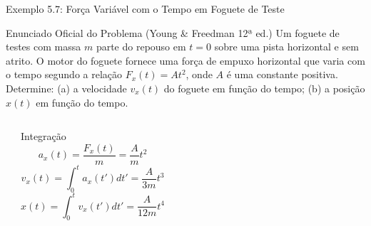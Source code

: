 \documentclass[10pt,aspectratio=169]{beamer}
\begin{document}
\begin{frame}{Exemplo 5.7: Força Variável com o Tempo em Foguete de Teste}
    \begin{block}{Enunciado Oficial do Problema (Young \& Freedman 12ª ed.)}
        \small
        Um foguete de testes com massa $m$ parte do repouso em $t=0$ sobre uma pista horizontal e sem atrito. O motor do foguete fornece uma força de empuxo horizontal que varia com o tempo segundo a relação $F_x(t) = A t^2$, onde $A$ é uma constante positiva. Determine: (a) a velocidade $v_x(t)$ do foguete em função do tempo; (b) a posição $x(t)$ em função do tempo.
    \end{block}
    \begin{columns}[T]
        \begin{center}
        \end{center}
        \begin{exampleblock}{Integração}
            \small
            $$a_x(t) = \frac{F_x(t)}{m} = \frac{A}{m} t^2$$
            $$v_x(t) = \int_0^t a_x(t') dt' = \frac{A}{3m} t^3$$
            $$x(t) = \int_0^t v_x(t') dt' = \frac{A}{12m} t^4$$
        \end{exampleblock}
    \end{columns}
\end{frame}
\end{document}
